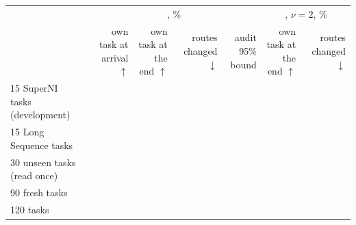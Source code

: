 {\footnotesize\setlength{\tabcolsep}{1.2pt}\begin{tabular}{lrrrrrr}
    \toprule
    & \multicolumn{4}{c}{\recog{}, \%} & \multicolumn{2}{c}{\handicap{}, $\nu = 2$, \%} \\
    \cmidrule(lr){2-5}\cmidrule(l){6-7}
    & \shortstack[r]{own task\\at arrival $\uparrow$} & \shortstack[r]{own task\\at the end $\uparrow$} & \shortstack[r]{routes\\changed $\downarrow$} & \shortstack[r]{audit\\95\% bound} & \shortstack[r]{own task\\at the end $\uparrow$} & \shortstack[r]{routes\\changed $\downarrow$} \\
    \midrule
    15 SuperNI tasks (development) & \AudDevLLamOneArrive{} & \AudDevLLamOneEnd{} & \AudDevLLamOneChanged{} & \AudDevLLamOneAuditBound{} & \AudDevHPrimeTTwoEnd{} & \AudDevHPrimeTTwoChanged{} \\
    15 Long Sequence tasks & \AudScaleLongThreeArrive{} & \AudScaleLongThreeEnd{} & \AudScaleLongThreeChanged{} & \AudScaleLongThreeAuditBound{} & \AudScaleLongThreeHEnd{} & \AudScaleLongThreeHChanged{} \\
    30 unseen tasks (read once) & \AudFreshFourthLArrive{} & \AudFreshFourthLEnd{} & \AudFreshFourthLChanged{} & \AudFreshFourthAuditBound{} & \AudFreshFourthHEnd{} & \AudFreshFourthHChanged{} \\
    90 fresh tasks & \AudScaleFreshNinetyArrive{} & \AudScaleFreshNinetyEnd{} & \AudScaleFreshNinetyChanged{} & \AudScaleFreshNinetyAuditBound{} & \AudScaleFreshNinetyHEnd{} & \AudScaleFreshNinetyHChanged{} \\
    120 tasks & \AudScaleAllHundredTwentyArrive{} & \AudScaleAllHundredTwentyEnd{} & \AudScaleAllHundredTwentyChanged{} & \AudScaleAllHundredTwentyAuditBound{} & \AudScaleAllHundredTwentyHEnd{} & \AudScaleAllHundredTwentyHChanged{} \\
    \bottomrule
\end{tabular}}
